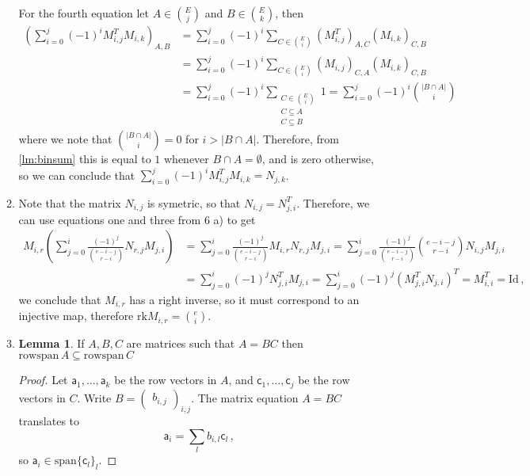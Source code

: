 \documentclass[kulak]{tplt}
\theoremstyle{definition}
\newtheorem{lm}[thm]{Lemma}
\newcommand{\va}{\mathsf{a}}
\newcommand{\vc}{\mathsf{c}}
\newcommand{\spn}{\mathrm{span}}
\newcommand{\rowspn}{\mathrm{rowspan}}
\newcommand{\rk}{\mathrm{rk}}
\newcommand{\Id}{\mathrm{Id}}
\begin{document}
\begin{enumerate}
\begin{enumerate}
For the fourth equation let $A \in \binom{E}{j}$ and $B \in \binom{E}{k}$, then
\begin{align*}
\left(\sum_{i=0}^j (-1)^i M_{i, j}^T M_{i, k}\right)_{A, B} &= \sum_{i=0}^j (-1)^i \sum_{C \in \binom{E}{i}} (M_{i, j}^T)_{A, C}( M_{i, k})_{C, B}\\
&=\sum_{i=0}^j (-1)^i \sum_{C \in \binom{E}{i}} (M_{i, j})_{C, A}( M_{i, k})_{C, B}\\
&=\sum_{i=0}^j (-1)^i \sum_{\substack{C \in \binom{E}{i}\\ C \subseteq A \\ C\subseteq B}} 1 =\sum_{i=0}^j (-1)^i \binom{|B \cap A|}{i}
\end{align*}
where we note that $\binom{|B \cap A|}{i} = 0 $ for $i > |B \cap A|$.
Therefore, from \cref{lm:binsum} this is equal to $1$ whenever $B \cap A = \emptyset $, and is zero otherwise, so we can conclude that
$\sum_{i=0}^j (-1)^i  M_{i, j}^T M_{i, k} = N_{j, k}$.




\item 
Note that the matrix $N_{i, j}$ is symetric, so that $N_{i, j} = N_{j, i}^T$.
Therefore, we can use equations one and three from 6 a) to get
\begin{align*}
M_{i, r} \left( \sum_{j=0}^i \frac{(-1)^j}{\binom{e-i-j}{r-i}} N_{r, j} M_{j, i}\right) &= \sum_{j=0}^i \frac{(-1)^j}{\binom{e-i-j}{r-i}}M_{i, r} N_{r, j} M_{j, i} = \sum_{j=0}^i \frac{(-1)^j}{\binom{e-i-j}{r-i}}\binom{e-i-j}{r-i} N_{i, j} M_{j, i}\\
&= \sum_{j=0}^i (-1)^j N_{j, i}^T M_{j, i} = \sum_{j=0}^i (-1)^j \left(M_{j, i}^T N_{j, i} \right)^T = M_{i, i}^T = \Id \, ,
\end{align*}
we conclude that $M_{i, r}$ has a right inverse, so it must correspond to an injective map, therefore $\rk M_{i, r} = \binom{e}{i}$.

\item 

\begin{lm}\label{lm:rowspan}
If $A, B, C$ are matrices such that $A = BC$ then $\rowspn \, A \subseteq \rowspn \, C$
\end{lm}

\begin{proof}
Let $\va_1, \ldots , \va_k$ be the row vectors in $A$, and $\vc_1, \ldots, \vc_j$ be the row vectors in $C$.
Write $B = \begin{pmatrix}
b_{i, j}
\end{pmatrix}_{i, j}$.
The matrix equation $A = BC$ translates to
$$ \va_i = \sum_l b_{i, l} \vc_l \, ,$$
so $\va_i \in \spn \{\vc_l\}_l$.
\end{proof}


\end{enumerate}
\end{enumerate}
\end{document}
